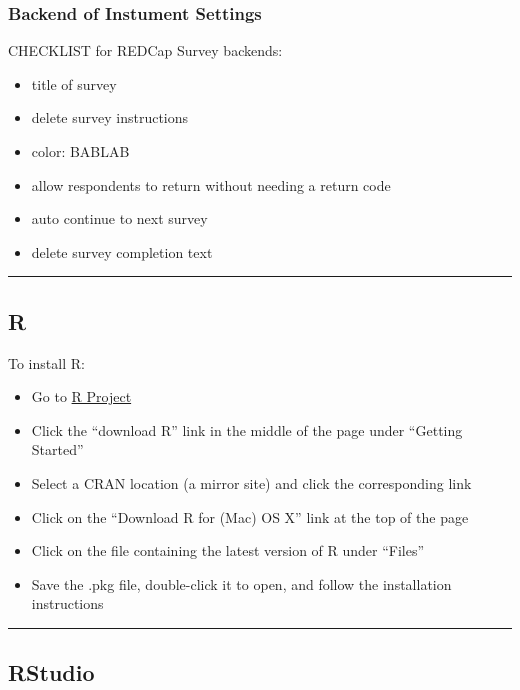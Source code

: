 \documentclass[
]{book}
\providecommand{\tightlist}{%
  \setlength{\itemsep}{0pt}\setlength{\parskip}{0pt}}
\begin{document}
\hypertarget{backend-of-instument-settings}{%
\subsubsection{Backend of Instument Settings}\label{backend-of-instument-settings}}

CHECKLIST for REDCap Survey backends:

\begin{itemize}
\tightlist
\item
  title of survey
\item
  delete survey instructions
\item
  color: BABLAB
\item
  allow respondents to return without needing a return code
\item
  auto continue to next survey
\item
  delete survey completion text
\end{itemize}

\begin{center}\rule{0.5\linewidth}{0.5pt}\end{center}

\hypertarget{r}{%
\subsection{R}\label{r}}

To install R:

\begin{itemize}
\tightlist
\item
  Go to \href{http://www.r-project.org}{R Project}
\item
  Click the ``download R'' link in the middle of the page under ``Getting Started''
\item
  Select a CRAN location (a mirror site) and click the corresponding link
\item
  Click on the ``Download R for (Mac) OS X'' link at the top of the page
\item
  Click on the file containing the latest version of R under ``Files''
\item
  Save the .pkg file, double-click it to open, and follow the installation instructions
\end{itemize}

\begin{center}\rule{0.5\linewidth}{0.5pt}\end{center}

\hypertarget{rstudio}{%
\subsection{RStudio}\label{rstudio}}
\end{document}
